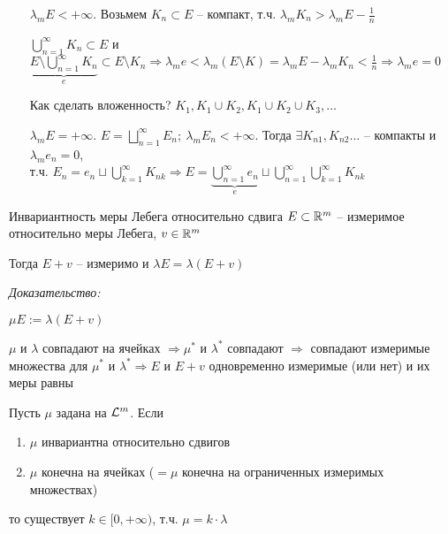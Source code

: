 \documentclass[12pt]{article}
\begin{document}
\begin{itemize}
    \item[$\lambda_m E < + \infty$. ] Возьмем $K_n \subset E$ -- компакт, т.ч. $\lambda_m K_n > \lambda_m E - \frac{1}{n}$
    
    $\bigcup\limits_{n = 1}^\infty K_n \subset E$ и $\underbrace{E \setminus \bigcup\limits_{n = 1}^\infty K_n}_{e} \subset E \setminus K_n \Rightarrow \lambda_m e < \lambda_m (E \setminus K) = \lambda_m E - \lambda_m K_n < \frac{1}{n} \Rightarrow \lambda_m e = 0$

    Как сделать вложенность? $K_1, K_1 \cup K_2, K_1 \cup K_2 \cup K_3, \ldots$

    \item[$\lambda_m E = + \infty$. ] $E = \bigsqcup\limits_{n = 1}^\infty E_n;\ \lambda_m E_n < + \infty$. Тогда $\exists K_{n1}, K_{n2} \ldots$ -- компакты и $\lambda_m e_n = 0$, \\
    т.ч. $E_n = e_n \sqcup \bigcup\limits_{k = 1}^\infty K_{nk} \Rightarrow E = \underbrace{\bigcup\limits_{n = 1}^\infty e_n}_{e} \sqcup \bigcup\limits_{n = 1}^\infty \bigcup\limits_{k = 1}^\infty K_{nk}$
\end{itemize}

\begin{theo}{Инвариантность меры Лебега относительно сдвига}
    $E \subset \mathbb R^m$ -- измеримое относительно меры Лебега, $v \in \mathbb R^m$

    Тогда $E + v$ -- измеримо и $\lambda E = \lambda(E + v)$
\end{theo}

\textit{Доказательство:}

$\mu E := \lambda(E + v)$

$\mu$ и $\lambda$ совпадают на ячейках $\Rightarrow \mu^*$ и $\lambda^*$ совпадают $\Rightarrow$ совпадают измеримые множества для $\mu^*$ и $\lambda^* \Rightarrow E$ и $E + v$ одновременно измеримые (или нет) и их меры равны

\begin{theo}{}
    Пусть $\mu$ задана на $\mathcal{L}^m$. Если 

    \begin{enumerate}
        \item $\mu$ инвариантна относительно сдвигов
        \item $\mu$ конечна на ячейках ($= \mu$ конечна на ограниченных измеримых множествах)
    \end{enumerate}

    то существует $k \in [0, + \infty)$, т.ч. $\mu = k \cdot \lambda$
\end{theo}
\end{document}
